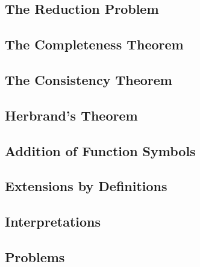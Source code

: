 \subsection{The Reduction Problem}


\subsection{The Completeness Theorem}


\subsection{The Consistency Theorem}


\subsection{Herbrand's Theorem}


\subsection{Addition of Function Symbols}


\subsection{Extensions by Definitions}


\subsection{Interpretations}


\subsection{Problems}
